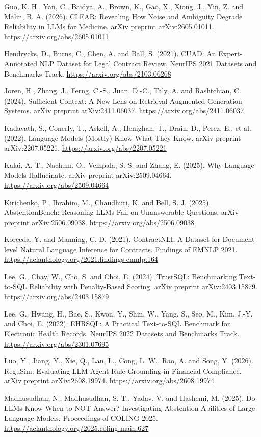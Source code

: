 \documentclass[10pt,twocolumn]{article}
\begin{document}
Guo, K. H., Yan, C., Baidya, A., Brown, K., Gao, X., Xiong, J., Yin, Z. and Malin, B. A. (2026). CLEAR: Revealing How Noise and Ambiguity Degrade Reliability in LLMs for Medicine. arXiv preprint arXiv:2605.01011. \url{https://arxiv.org/abs/2605.01011}

Hendrycks, D., Burns, C., Chen, A. and Ball, S. (2021). CUAD: An Expert-Annotated NLP Dataset for Legal Contract Review. NeurIPS 2021 Datasets and Benchmarks Track. \url{https://arxiv.org/abs/2103.06268}

Joren, H., Zhang, J., Ferng, C.-S., Juan, D.-C., Taly, A. and Rashtchian, C. (2024). Sufficient Context: A New Lens on Retrieval Augmented Generation Systems. arXiv preprint arXiv:2411.06037. \url{https://arxiv.org/abs/2411.06037}

Kadavath, S., Conerly, T., Askell, A., Henighan, T., Drain, D., Perez, E., et al. (2022). Language Models (Mostly) Know What They Know. arXiv preprint arXiv:2207.05221. \url{https://arxiv.org/abs/2207.05221}

Kalai, A. T., Nachum, O., Vempala, S. S. and Zhang, E. (2025). Why Language Models Hallucinate. arXiv preprint arXiv:2509.04664. \url{https://arxiv.org/abs/2509.04664}

Kirichenko, P., Ibrahim, M., Chaudhuri, K. and Bell, S. J. (2025). AbstentionBench: Reasoning LLMs Fail on Unanswerable Questions. arXiv preprint arXiv:2506.09038. \url{https://arxiv.org/abs/2506.09038}

Koreeda, Y. and Manning, C. D. (2021). ContractNLI: A Dataset for Document-level Natural Language Inference for Contracts. Findings of EMNLP 2021. \url{https://aclanthology.org/2021.findings-emnlp.164}

Lee, G., Chay, W., Cho, S. and Choi, E. (2024). TrustSQL: Benchmarking Text-to-SQL Reliability with Penalty-Based Scoring. arXiv preprint arXiv:2403.15879. \url{https://arxiv.org/abs/2403.15879}

Lee, G., Hwang, H., Bae, S., Kwon, Y., Shin, W., Yang, S., Seo, M., Kim, J.-Y. and Choi, E. (2022). EHRSQL: A Practical Text-to-SQL Benchmark for Electronic Health Records. NeurIPS 2022 Datasets and Benchmarks Track. \url{https://arxiv.org/abs/2301.07695}

Luo, Y., Jiang, Y., Xie, Q., Lan, L., Cong, L. W., Rao, A. and Song, Y. (2026). ReguSim: Evaluating LLM Agent Rule Grounding in Financial Compliance. arXiv preprint arXiv:2608.19974. \url{https://arxiv.org/abs/2608.19974}

Madhusudhan, N., Madhusudhan, S. T., Yadav, V. and Hashemi, M. (2025). Do LLMs Know When to NOT Answer? Investigating Abstention Abilities of Large Language Models. Proceedings of COLING 2025. \url{https://aclanthology.org/2025.coling-main.627}
\end{document}
